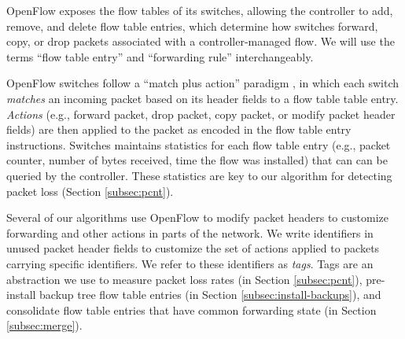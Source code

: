 OpenFlow exposes the flow tables of its switches, allowing the controller to add, remove, and delete flow table entries, which determine how switches 
forward, copy, or drop packets associated with a controller-managed flow. We will use the terms ``flow table entry'' and ``forwarding rule'' interchangeably. %

OpenFlow switches follow a ``match plus action'' paradigm \cite{OpenFlow08}, in which each switch \emph{matches} an incoming packet based on its header fields
to a flow table table entry. \emph{Actions} (e.g., forward packet, drop packet, copy packet, or modify packet header fields) are then applied to the packet as encoded in the flow table 
entry instructions. Switches maintains statistics for each flow table entry (e.g., packet counter, number of bytes received, time the flow was installed) that can 
can be queried by the controller.  These statistics are key to our algorithm for detecting packet loss (Section \ref{subsec:pcnt}).

Several of our algorithms use OpenFlow to modify packet headers to customize forwarding and other actions in parts of the network.  We write identifiers in unused packet
header fields to customize the set of actions applied to packets carrying specific identifiers.
We refer to these identifiers as \emph{tags}.  Tags are an abstraction we use to measure packet loss rates (\pcnt in Section \ref{subsec:pcnt}), 
pre-install backup tree flow table entries (\pre in Section \ref{subsec:install-backups}), and consolidate flow table entries that have common forwarding state (\merge in Section \ref{subsec:merge}).



